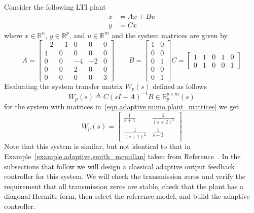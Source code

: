 Consider the following LTI plant
\begin{equation*}
  \begin{split}
    \dot{x}&=Ax+Bu \\
    y&=Cx
  \end{split}
\end{equation*}
where $x\in\mathbb{R}^{n}$, $y\in\mathbb{R}^{p}$, and $u\in\mathbb{R}^{m}$ and the system matrices are given by
\begin{equation}\label{eqn.adaptive.mimo.plant_matrices}
  A=
  \begin{bmatrix}
    -2 & -1 & 0 & 0 & 0 \\
    1 & 0 & 0 & 0 & 0 \\
    0 & 0 & -4 & -2 & 0 \\
    0 & 0 & 2 & 0 & 0 \\
    0 & 0 & 0 & 0 & 3
  \end{bmatrix}
  \qquad
  B=
  \begin{bmatrix}
    1 & 0 \\
    0 & 0 \\
    0 & 1 \\
    0 & 0 \\
    0 & 1
  \end{bmatrix}
  C=
  \begin{bmatrix}
    1 & 1 & 0 & 1 & 0 \\
    0 & 1 & 0 & 0 & 1
  \end{bmatrix}
\end{equation}
Evaluating the system transfer matrix $W_{p}(s)$ defined as follows
\begin{equation*}
  W_{p}(s)\triangleq C(sI-A)^{-1}B\in\mathbb{R}_{p}^{p\times m}(s)
\end{equation*}
for the system with matrices in~\eqref{eqn.adaptive.mimo.plant_matrices} we get
\begin{equation}\label{eqn.adaptive.mimo.wp}
  W_{p}(s)=
  \begin{bmatrix}
    \frac{1}{s+1}& \frac{2}{(s+2)^{2}} \\
    \frac{1}{(s+1)^{2}} & \frac{1}{s-3}
  \end{bmatrix}
\end{equation}
Note that this system is similar, but not identical to that in Example~\ref{example.adaptive.smith_mcmillan} taken from Reference~\cite{narendra.stable.2005}.
In the subsections that follow we will design a classical adaptive output feedback controller for this system.
We will check the transmission zeros and verify the requirement that all transmission zeros are stable, check that the plant has a diagonal Hermite form, then select the reference model, and build the adaptive controller.

